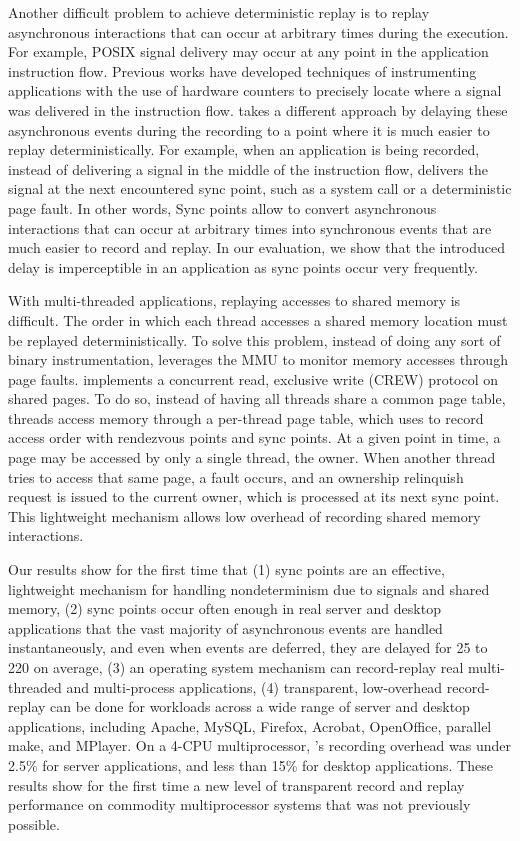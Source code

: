 Another difficult problem to achieve deterministic replay is to replay
asynchronous interactions that can occur at arbitrary times during the
execution. For example, POSIX signal delivery may occur at any point in the
application instruction flow. Previous works have developed techniques
of instrumenting applications with the use of hardware counters to precisely
locate where a signal was delivered in the instruction flow.
\scribe takes a different approach by delaying these asynchronous events
during the recording to a point where it is much easier to replay
deterministically. For example, when an application is being recorded,
instead of delivering a signal in the middle of the instruction flow, \scribe
delivers the signal at the next encountered sync point, such as a system call or
a deterministic page fault. In other words,
Sync points allow \scribe to convert asynchronous interactions that can occur at
arbitrary times into synchronous events that are much easier to record and
replay. In our evaluation, we show that the introduced delay is imperceptible
in an application as sync points occur very frequently.

With multi-threaded applications, replaying accesses to shared memory is
difficult. The order in which each thread accesses a shared memory location must
be replayed deterministically. To solve this problem, instead of doing any sort
of binary instrumentation, \scribe leverages the MMU to monitor memory accesses
through page faults. \scribe implements a concurrent read, exclusive write
(CREW) protocol on shared pages. To do so, instead of having all threads share a
common page table, threads access memory through a per-thread page table, which
\scribe uses to record access order with rendezvous points and sync points.
At a given point in time, a page may be accessed by only a single thread, the
owner. When another thread tries to access that same page, a fault occurs,
and an ownership relinquish request is issued to the current owner, which is
processed at its next sync point. This lightweight mechanism allows low
overhead of recording shared memory interactions.

Our results show for the first time that (1) sync points are an effective,
lightweight mechanism for handling nondeterminism due to signals and shared
memory, (2) sync points occur often enough in real server and desktop
applications that the vast majority of asynchronous events are handled
instantaneously, and even when events are deferred, they are delayed for 25 to
220\us{} on average, (3) an operating system mechanism can record-replay real
multi-threaded and multi-process applications, (4) transparent, low-overhead
record-replay can be done for workloads across a wide range of server and
desktop applications, including Apache, MySQL, Firefox, Acrobat, OpenOffice,
parallel make, and MPlayer.  On a 4-CPU multiprocessor, \scribe{}'s recording
overhead was under 2.5\% for server applications, and less than 15\% for desktop
applications.  These results show for the first time a new level of transparent
record and replay performance on commodity multiprocessor systems that was not
previously possible. 

